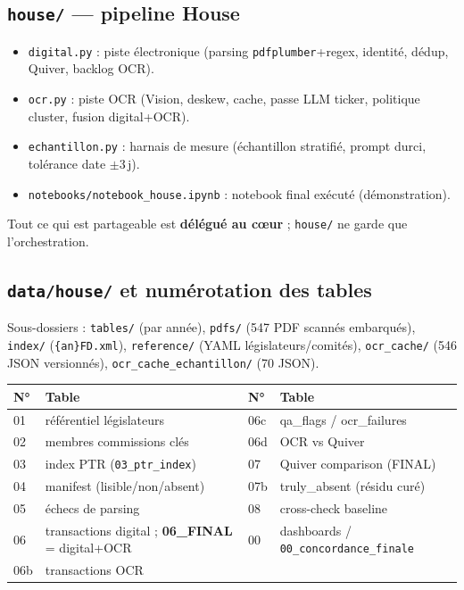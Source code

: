 \documentclass[11pt,a4paper]{article}
\begin{document}
\subsection{\texttt{house/} --- pipeline House}
\begin{itemize}[nosep,leftmargin=1.3em]
\item \texttt{digital.py} : piste électronique (parsing \texttt{pdfplumber}+regex, identité, dédup, Quiver, backlog OCR).
\item \texttt{ocr.py} : piste OCR (Vision, deskew, cache, passe LLM ticker, politique cluster, fusion digital+OCR).
\item \texttt{echantillon.py} : harnais de mesure (échantillon stratifié, prompt durci, tolérance date $\pm$3\,j).
\item \texttt{notebooks/notebook\_house.ipynb} : notebook final exécuté (démonstration).
\end{itemize}
Tout ce qui est partageable est \textbf{délégué au cœur} ; \texttt{house/} ne garde que l'orchestration.

\subsection{\texttt{data/house/} et numérotation des tables}
Sous-dossiers : \texttt{tables/} (par année), \texttt{pdfs/} (547 PDF scannés embarqués), \texttt{index/}
(\texttt{\{an\}FD.xml}), \texttt{reference/} (YAML législateurs/comités), \texttt{ocr\_cache/} (546 JSON
versionnés), \texttt{ocr\_cache\_echantillon/} (70 JSON).

\begin{center}\small
\begin{tabular}{@{}llll@{}}
\toprule
\textbf{N°} & \textbf{Table} & \textbf{N°} & \textbf{Table} \\
\midrule
01 & référentiel législateurs & 06c & qa\_flags / ocr\_failures \\
02 & membres commissions clés & 06d & OCR vs Quiver \\
03 & index PTR (\texttt{03\_ptr\_index}) & 07 & Quiver comparison (FINAL) \\
04 & manifest (lisible/non/absent) & 07b & truly\_absent (résidu curé) \\
05 & échecs de parsing & 08 & cross-check baseline \\
06 & transactions digital ; \textbf{06\_FINAL} = digital+OCR & 00 & dashboards / \texttt{00\_concordance\_finale} \\
06b & transactions OCR & & \\
\bottomrule
\end{tabular}
\end{center}
\end{document}
